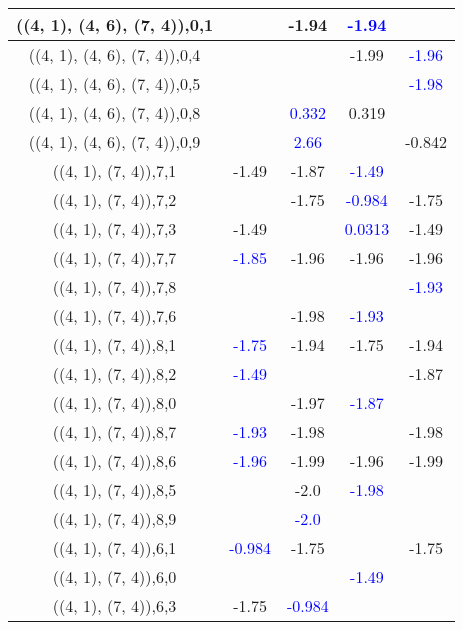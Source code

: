 \documentclass{article}
\begin{document}
\begin{center}
\begin{longtable}{|c|c|c|c|c|}
        	\hline
        	((4, 1), (4, 6), (7, 4)),0,1&&-1.94& \textcolor{blue}{-1.94}&\\
        	\hline
        	((4, 1), (4, 6), (7, 4)),0,4&&&-1.99& \textcolor{blue}{-1.96}\\
        	\hline
        	((4, 1), (4, 6), (7, 4)),0,5&&&& \textcolor{blue}{-1.98}\\
        	\hline
        	((4, 1), (4, 6), (7, 4)),0,8&& \textcolor{blue}{0.332}&0.319&\\
        	\hline
        	((4, 1), (4, 6), (7, 4)),0,9&& \textcolor{blue}{2.66}&&-0.842\\
        	\hline
        	((4, 1), (7, 4)),7,1&-1.49&-1.87& \textcolor{blue}{-1.49}&\\
        	\hline
        	((4, 1), (7, 4)),7,2&&-1.75& \textcolor{blue}{-0.984}&-1.75\\
        	\hline
        	((4, 1), (7, 4)),7,3&-1.49&& \textcolor{blue}{0.0313}&-1.49\\
        	\hline
        	((4, 1), (7, 4)),7,7& \textcolor{blue}{-1.85}&-1.96&-1.96&-1.96\\
        	\hline
        	((4, 1), (7, 4)),7,8&&&& \textcolor{blue}{-1.93}\\
        	\hline
        	((4, 1), (7, 4)),7,6&&-1.98& \textcolor{blue}{-1.93}&\\
        	\hline
        	((4, 1), (7, 4)),8,1& \textcolor{blue}{-1.75}&-1.94&-1.75&-1.94\\
        	\hline
        	((4, 1), (7, 4)),8,2& \textcolor{blue}{-1.49}&&&-1.87\\
        	\hline
        	((4, 1), (7, 4)),8,0&&-1.97& \textcolor{blue}{-1.87}&\\
        	\hline
        	((4, 1), (7, 4)),8,7& \textcolor{blue}{-1.93}&-1.98&&-1.98\\
        	\hline
        	((4, 1), (7, 4)),8,6& \textcolor{blue}{-1.96}&-1.99&-1.96&-1.99\\
        	\hline
        	((4, 1), (7, 4)),8,5&&-2.0& \textcolor{blue}{-1.98}&\\
        	\hline
        	((4, 1), (7, 4)),8,9&& \textcolor{blue}{-2.0}&&\\
        	\hline
        	((4, 1), (7, 4)),6,1& \textcolor{blue}{-0.984}&-1.75&&-1.75\\
        	\hline
        	((4, 1), (7, 4)),6,0&&& \textcolor{blue}{-1.49}&\\
        	\hline
        	((4, 1), (7, 4)),6,3&-1.75& \textcolor{blue}{-0.984}&&\\

\end{longtable}
\end{center}
\end{document}
